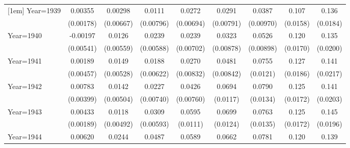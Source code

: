 \begin{table}[htbp]
\begin{tabular}{l*{8}{c}}
[1em]
Year=1939           &     0.00355\sym{**} &     0.00298         &      0.0111         &      0.0272\sym{***}&      0.0291\sym{***}&      0.0387\sym{***}&       0.107\sym{***}&       0.136\sym{***}\\
                    &   (0.00178)         &   (0.00667)         &   (0.00796)         &   (0.00694)         &   (0.00791)         &   (0.00970)         &    (0.0158)         &    (0.0184)         \\
[1em]
Year=1940           &    -0.00197         &      0.0126\sym{**} &      0.0239\sym{***}&      0.0239\sym{***}&      0.0323\sym{***}&      0.0526\sym{***}&       0.120\sym{***}&       0.135\sym{***}\\
                    &   (0.00541)         &   (0.00559)         &   (0.00588)         &   (0.00702)         &   (0.00878)         &   (0.00898)         &    (0.0170)         &    (0.0200)         \\
[1em]
Year=1941           &     0.00189         &      0.0149\sym{***}&      0.0188\sym{***}&      0.0270\sym{***}&      0.0481\sym{***}&      0.0755\sym{***}&       0.127\sym{***}&       0.141\sym{***}\\
                    &   (0.00457)         &   (0.00528)         &   (0.00622)         &   (0.00832)         &   (0.00842)         &    (0.0121)         &    (0.0186)         &    (0.0217)         \\
[1em]
Year=1942           &     0.00783\sym{*}  &      0.0142\sym{***}&      0.0227\sym{***}&      0.0426\sym{***}&      0.0694\sym{***}&      0.0790\sym{***}&       0.125\sym{***}&       0.141\sym{***}\\
                    &   (0.00399)         &   (0.00504)         &   (0.00740)         &   (0.00760)         &    (0.0117)         &    (0.0134)         &    (0.0172)         &    (0.0203)         \\
[1em]
Year=1943           &     0.00433\sym{**} &      0.0118\sym{**} &      0.0309\sym{***}&      0.0595\sym{***}&      0.0699\sym{***}&      0.0763\sym{***}&       0.125\sym{***}&       0.145\sym{***}\\
                    &   (0.00189)         &   (0.00492)         &   (0.00593)         &    (0.0111)         &    (0.0124)         &    (0.0135)         &    (0.0172)         &    (0.0196)         \\
[1em]
Year=1944           &     0.00620         &      0.0244\sym{***}&      0.0487\sym{***}&      0.0589\sym{***}&      0.0662\sym{***}&      0.0781\sym{***}&       0.120\sym{***}&       0.139\sym{***}\\

\end{tabular}
\end{table}
